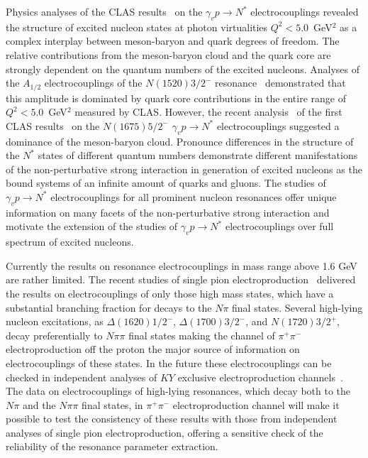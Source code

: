 Physics analyses of the CLAS results~\cite{Aznauryan:2009mx,Mokeev:2012vsa,Mokeev:2013kka} on the $\gamma_vp \rightarrow N^*$ electrocouplings revealed the 
structure of excited nucleon states at photon virtualities $Q^2 < 5.0$~GeV$^2$ as a complex interplay between 
meson-baryon and quark degrees of freedom. The relative contributions from the meson-baryon cloud and the quark 
core are strongly dependent on the quantum numbers of the excited nucleons. Analyses of the $A_{1/2}$ 
electrocouplings of the $N(1520)3/2^-$ resonance~\cite{JuliaDiaz:2007fa,Santopinto:2012nq} demonstrated that this amplitude is dominated 
by quark core contributions in the entire range of $Q^2 < 5.0$~GeV$^2$ measured by CLAS. However, the recent 
analysis~\cite{Aznauryan:2014xea} of the first CLAS results~\cite{Park:2014yea} on the $N(1675)5/2^-$ $\gamma_vp \rightarrow N^*$ electrocouplings 
suggested a dominance of the meson-baryon cloud. Pronounce differences in the structure of the $N^*$ states of different quantum numbers demonstrate different manifestations of the non-perturbative strong interaction in generation of excited nucleons as the bound systems of an infinite amount of quarks and gluons. The studies of $\gamma_vp \rightarrow N^*$ electrocouplings for all prominent nucleon resonances offer unique information on many facets of the non-perturbative strong interaction and motivate the extension of the studies of $\gamma_vp \rightarrow N^*$ electrocouplings over full spectrum of excited nucleons.  


Currently the results on resonance electrocouplings in mass range above 1.6 GeV are rather limited. The recent studies of
single pion electroproduction~\cite{Park:2014yea} delivered the results on electrocouplings of only those high mass states, which have a substantial branching fraction for decays to the $N\pi$ final states. Several high-lying nucleon excitations, as $\Delta(1620)1/2^-$,
$\Delta(1700)3/2^-$, and $N(1720)3/2^+$, decay preferentially to $N\pi\pi$ final states making the channel of $\pi^+\pi^-$ electroproduction off the proton the major source of information on electrocouplings of these states. In the future these electrocouplings can be checked in independent analyses of $KY$ exclusive electroproduction channels~\cite{Carman:2016hlp}. The data on electrocouplings of high-lying resonances, which decay both to the $N\pi$ and the $N\pi\pi$ final states, in  $\pi^+\pi^-$ electroproduction channel will make it possible to test the consistency of these results with those from independent analyses of single pion electroproduction, offering a sensitive check of the reliability of the resonance parameter extraction.




